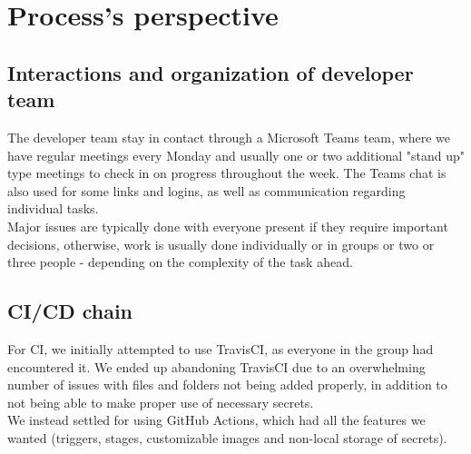 \section{Process's perspective} \label{section:Process perspective}

\subsection{Interactions and organization of developer team} %
The developer team stay in contact through a Microsoft Teams team, where we have regular meetings every Monday and usually one or two additional "stand up" type meetings to check in on progress throughout the week. The Teams chat is also used for some links and logins, as well as communication regarding individual tasks. \\ \indent Major issues are typically done with everyone present if they require important decisions, otherwise, work is usually done individually or in groups or two or three people - depending on the complexity of the task ahead.
 

\subsection{CI/CD chain} %
For CI, we initially attempted to use TravisCI, as everyone in the group had encountered it. We ended up abandoning TravisCI due to an overwhelming number of issues with files and folders not being added properly, in addition to not being able to make proper use of necessary secrets. \\ \indent We instead settled for using GitHub Actions, which had all the features we wanted (triggers, stages, customizable images and non-local storage of secrets).

